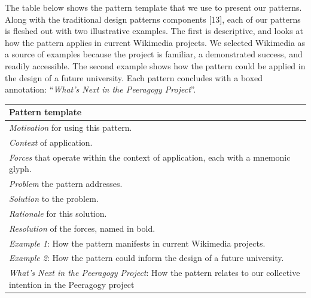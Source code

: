 The table below shows the pattern template that we use to present our
patterns. Along with the traditional design patterns components
{{[}13{]}}, each of our patterns is fleshed out with two illustrative
examples. The first is descriptive, and looks at how the pattern applies
in current Wikimedia projects. We selected Wikimedia as a source of
examples because the project is familiar, a demonstrated success, and
readily accessible. The second example shows how the pattern could be
applied in the design of a future university. Each pattern concludes
with a boxed annotation: ``\emph{What's Next in the Peeragogy
Project}''.

\begin{longtable}[]{@{}l@{}}
\toprule
\begin{minipage}[b]{0.97\columnwidth}\raggedright
Pattern template\strut
\end{minipage}\tabularnewline
\midrule
\endhead
\begin{minipage}[t]{0.97\columnwidth}\raggedright
\emph{Motivation} for using this pattern.\strut
\end{minipage}\tabularnewline
\begin{minipage}[t]{0.97\columnwidth}\raggedright
\emph{Context} of application.\strut
\end{minipage}\tabularnewline
\begin{minipage}[t]{0.97\columnwidth}\raggedright
\emph{Forces} that operate within the context of application, each with
a mnemonic glyph.\strut
\end{minipage}\tabularnewline
\begin{minipage}[t]{0.97\columnwidth}\raggedright
\emph{Problem} the pattern addresses.\strut
\end{minipage}\tabularnewline
\begin{minipage}[t]{0.97\columnwidth}\raggedright
\emph{Solution} to the problem.\strut
\end{minipage}\tabularnewline
\begin{minipage}[t]{0.97\columnwidth}\raggedright
\emph{Rationale} for this solution.\strut
\end{minipage}\tabularnewline
\begin{minipage}[t]{0.97\columnwidth}\raggedright
\emph{Resolution} of the forces, named in bold.\strut
\end{minipage}\tabularnewline
\begin{minipage}[t]{0.97\columnwidth}\raggedright
\emph{Example 1}: How the pattern manifests in current Wikimedia
projects.\strut
\end{minipage}\tabularnewline
\begin{minipage}[t]{0.97\columnwidth}\raggedright
\emph{Example 2}: How the pattern could inform the design of a future
university.\strut
\end{minipage}\tabularnewline
\begin{minipage}[t]{0.97\columnwidth}\raggedright
\emph{What's Next in the Peeragogy Project}: How the pattern relates to
our collective intention in the Peeragogy project\strut
\end{minipage}\tabularnewline
\bottomrule
\end{longtable}


